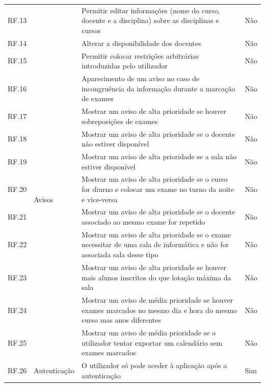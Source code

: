 \documentclass[12pt, twoside]{report}
\begin{document}
\begin{center}
\begin{longtable}{|m{1cm}|m{2.2cm}|m{9cm}|m{3cm}|}
			RF.13 && Permitir editar informações (nome do curso, docente e a disciplina) sobre as disciplinas e cursos & Não\\
			
			RF.14 && Alterar a disponibilidade dos docentes & Não\\
			
			RF.15 && Permitir colocar restrições arbitrárias introduzidas pelo utilizador & Não \\
			\hline	
			
			RF.16 &\multirow{9}{2cm}{Avisos}& Aparecimento de um aviso no caso de incongruência da informação durante a marcação de exames & Não \\
			
			RF.17 &&Mostrar um aviso de alta prioridade se houver sobreposições de exames & Não\\
			
			RF.18 && Mostrar um aviso de alta prioridade se o docente não estiver disponível & Não \\
			
			RF.19 && Mostrar um aviso de alta prioridade se a sala não estiver disponível & Não\\
			
			RF.20 && Mostrar um aviso de alta prioridade se o curso for diurno e colocar um exame no turno da noite e vice-versa & Não\\
			
			RF.21&&Mostrar um aviso de alta prioridade se o docente associado ao mesmo exame for repetido & Não \\
			
			RF.22 && Mostrar um aviso de alta prioridade se o exame necessitar de uma sala de informática e não for associada sala desse tipo & Não\\
			
			RF.23 && Mostrar um aviso de alta prioridade se houver mais alunos inscritos do que  lotação máxima da sala & Não\\
			
			RF.24 && Mostrar um aviso de média prioridade se houver exames marcados no mesmo dia e hora do mesmo curso mas anos diferentes & Não\\
			
			
			RF.25 && Mostrar um aviso de média prioridade se o utilizador tentar exportar um calendário sem exames marcados & Não\\
			\hline
			
			RF.26 &Autenticação& O utilizador só pode aceder à aplicação após a autenticação & Sim\\
			\hline
			

\end{longtable}
\end{center}
\end{document}
